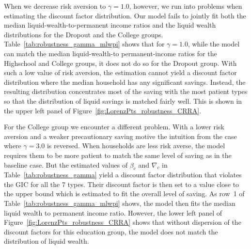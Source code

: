 \documentclass[\PathToRoot/\ProjectName]{subfiles}
\begin{document}
When we decrease risk aversion to $\gamma=1.0$, however, we run into problems when estimating the discount factor distribution.
Our model fails to jointly fit both the median liquid-wealth-to-permanent income ratios and the liquid wealth distributions for the Dropout and the College groups.
Table~\ref{tab:robustness_gamma_mlwpi} shows that for $\gamma=1.0$, while the model can match the median liquid-wealth-to permanent-income ratios for the Highschool and College groups, it does not do so for the Dropout group.
With such a low value of risk aversion, the estimation cannot yield a discount factor distribution where the median household has any significant savings.
Instead, the resulting distribution concentrates most of the saving with the most patient types so that the distribution of liquid savings is matched fairly well.
This is shown in the upper left panel of Figure~\ref{fig:LorenzPts_robustness_CRRA}.

For the College group we encounter a different problem.
With a lower risk aversion and a weaker precautionary saving motive the intuition from the case where $\gamma=3.0$ is reversed.
When households are less risk averse, the model requires them to be more patient to match the same level of saving as in the baseline case.
But the estimated values of $\beta_c$ and $\nabla_c$ in Table~\ref{tab:robustness_gamma} yield a discount factor distribution that violates the GIC for all the 7 types.
Their discount factor is then set to a value close to the upper bound which is estimated to fit the overall level of saving.
As row~1 of Table~\ref{tab:robustness_gamma_mlwpi} shows, the model then fits the median liquid wealth to permanent income ratio.
However, the lower left panel of Figure~\ref{fig:LorenzPts_robustness_CRRA} shows that without dispersion of the discount factors for this education group, the model does not match the distribution of liquid wealth.
\end{document}
